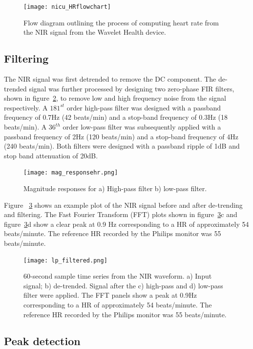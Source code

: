 \begin{figure}[!ht]
    \centering
\texttt{[image: nicu\_HRflowchart]}
    \caption{Flow diagram outlining the process of computing heart rate from the NIR signal from the Wavelet Health device.}
    \label{HRoverview} 
\end{figure}

\subsection{Filtering}

The NIR signal was first detrended to remove the DC component. The de-trended signal was further processed by designing two zero-phase FIR filters, shown in figure~\ref{mag_HR}, to remove low and high frequency noise from the signal respectively. A $181^{st}$ order high-pass filter was designed with a passband frequency of  0.7Hz (42 beats/min) and a stop-band frequency of 0.3Hz (18 beats/min). A $36^{th}$ order low-pass filter was subsequently applied with a passband frequency of 2Hz (120 beats/min) and a stop-band frequency of 4Hz (240 beats/min). Both filters were designed with a passband ripple of 1dB and stop band attenuation of 20dB.
 

\begin{figure}[!ht]
\centering
\texttt{[image: mag\_responsehr.png]}
    \caption[Magnitude responses.]{Magnitude responses for a) High-pass filter b) low-pass filter.}
        \label{mag_HR}
\end{figure}

Figure ~\ref{figfilt} shows an example plot of the NIR signal before and after de-trending and filtering. The Fast Fourier Transform (FFT) plots shown in figure~\ref{figfilt}c and figure~\ref{figfilt}d show a clear peak at 0.9 Hz corresponding to a HR of approximately 54 beats/minute. The reference HR recorded by the Philips monitor was 55 beats/minute.


\begin{figure}[!ht]
\centering
\texttt{[image: lp\_filtered.png]}
    \caption[60-second sample time series from the NIR waveform.]{60-second sample time series from the NIR waveform. a) Input signal; b) de-trended. Signal after the c) high-pass and d) low-pass filter were applied. The FFT panels show a peak at 0.9Hz corresponding to a HR of approximately 54 beats/minute. The reference HR recorded by the Philips monitor was 55 beats/minute.}
    \label{figfilt}
\end{figure}

\subsection{Peak detection}
\label{peak_eqn}

